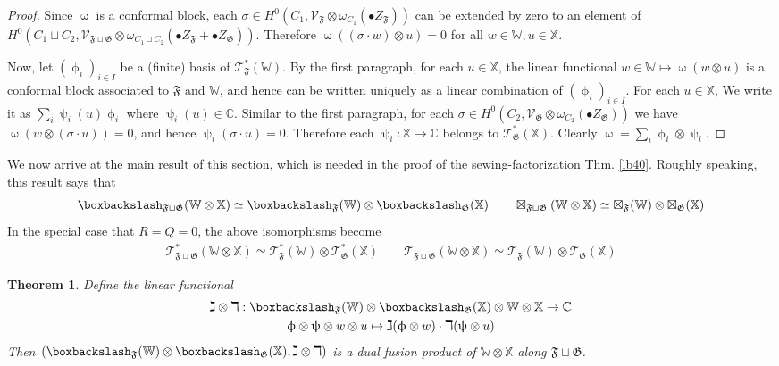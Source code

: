 \documentclass[11pt,b5paper,notitlepage]{article}
\theoremstyle{definition}
\theoremstyle{plain}
\newtheorem{thm}[df]{Theorem}
\newcommand{\fk}{\mathfrak}
\newcommand{\SV}{\mathscr{V}}
\newcommand{\blt}{\bullet}
\newcommand{\Xbb}{\mathbb X}
\newcommand{\Wbb}{\mathbb W}
\newcommand{\Cbb}{\mathbb C}
\newcommand{\<}{\left\langle}
\renewcommand{\>}{\right\rangle}
\newcommand{\ST}{\mathscr{T}}
\newcommand{\bbs}{\boxbackslash}
\newcommand{\ff}{\mathfrak{F}}
\newcommand{\fg}{\mathfrak{G}}
\numberwithin{equation}{section}
\begin{document}
\begin{proof}
Since $\upomega$ is a conformal block, each $\sigma\in H^0(C_1,\SV_\ff\otimes\omega_{C_1}(\blt Z_\ff))$ can be extended by zero to an element of $H^0(C_1\sqcup C_2,\SV_{\ff\sqcup\fg}\otimes \omega_{C_1\sqcup C_2}(\blt Z_\ff+\blt Z_\fg))$. Therefore $\upomega((\sigma\cdot w)\otimes u)=0$ for all $w\in\Wbb,u\in\Xbb$. 

Now, let $(\upphi_i)_{i\in I}$ be a (finite) basis of $\ST^*_\ff(\Wbb)$. By the first paragraph, for each $u\in\Xbb$, the linear functional $w\in\Wbb\mapsto \upomega(w\otimes u)$ is a conformal block associated to $\ff$ and $\Wbb$, and hence can be written uniquely as a linear combination of $(\upphi_i)_{i\in I}$. For each $u\in\Xbb$,  We write it as $\sum_i \uppsi_i(u)\upphi_i$ where $\uppsi_i(u)\in\Cbb$. Similar to the first paragraph, for each $\sigma\in H^0(C_2,\SV_\fg\otimes\omega_{C_2}(\blt Z_\fg))$ we have $\upomega(w\otimes (\sigma\cdot u))=0$, and hence $\uppsi_i(\sigma\cdot u)=0$. Therefore each $\uppsi_i:\Xbb\rightarrow\Cbb$ belongs to $\ST^*_\fg(\Xbb)$. Clearly $\upomega=\sum_i \upphi_i\otimes\uppsi_i$.
\end{proof}


We now arrive at the main result of this section, which is needed in the proof of the sewing-factorization Thm. \ref{lb40}. Roughly speaking, this result says that
\begin{gather*}
\bbs_{\ff\sqcup\fg}(\Wbb\otimes\Xbb)\simeq\bbs_\ff(\Wbb)\otimes\bbs_\fg(\Xbb)\qquad\boxtimes_{\ff\sqcup\fg}(\Wbb\otimes\Xbb)\simeq\boxtimes_\ff(\Wbb)\otimes\boxtimes_\fg(\Xbb)
\end{gather*}
In the special case that $R=Q=0$, the above isomorphisms become
\begin{gather*}
\ST^*_{\ff\sqcup\fg}(\Wbb\otimes\Xbb)\simeq\ST^*_\ff(\Wbb)\otimes\ST^*_\fg(\Xbb)\qquad\ST_{\ff\sqcup\fg}(\Wbb\otimes\Xbb)\simeq\ST_\ff(\Wbb)\otimes\ST_\fg(\Xbb)
\end{gather*}




\begin{thm}\label{lb16}
Define the linear functional
\begin{gather*}
\gimel\otimes\daleth: \bbs_{\fk F}(\Wbb)\otimes \bbs_{\fk G}(\Xbb)\otimes\Wbb\otimes \Xbb\rightarrow \Cbb\\
\upphi\otimes\uppsi\otimes w\otimes u\mapsto \gimel(\upphi\otimes w)\cdot\daleth(\uppsi\otimes u)
\end{gather*}
Then $(\bbs_{\fk F}(\Wbb)\otimes \bbs_{\fk G}(\Xbb),\gimel\otimes\daleth)$ is a dual fusion product of $\Wbb\otimes\Xbb$ along $\ff\sqcup\fg$.
\end{thm}
\end{document}
